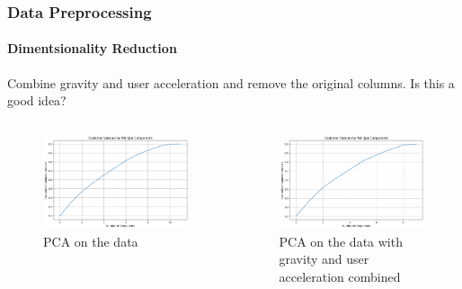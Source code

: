 \documentclass[
	11pt, %
]{beamer}
\begin{document}
\begin{frame}
    \frametitle{Data Preprocessing}
    \framesubtitle{Dimentsionality Reduction}

    Combine gravity and user acceleration and remove the original columns. Is this a good idea?

    \begin{columns}
        \begin{figure}[]
            \includegraphics[width=0.9\linewidth]{pca_before.png}
            \caption{PCA on the data}
        \end{figure}

        \begin{figure}
            \includegraphics[width=0.9\linewidth]{pca_after.png}
            \caption{PCA on the data with gravity and user acceleration combined}
        \end{figure}
    \end{columns}
        
\end{frame}
\end{document}
